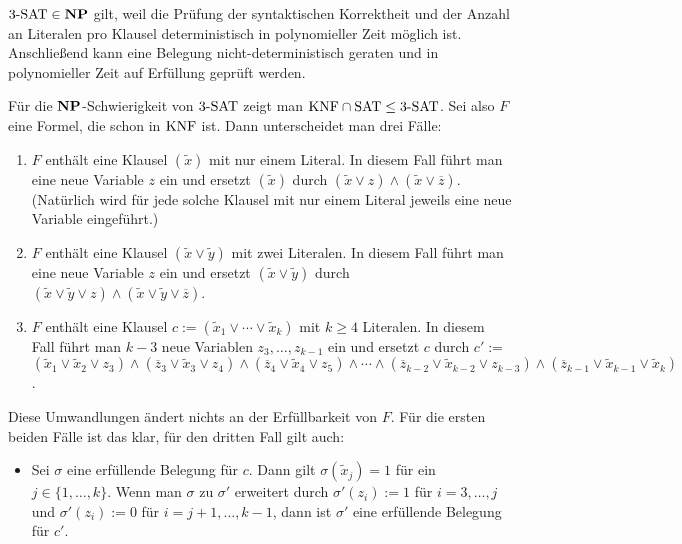 \begin{Beweis}
    $3\text{-SAT} \in \mathbf{NP}$ gilt, weil die Prüfung der syntaktischen Korrektheit und der Anzahl
    an Literalen pro Klausel deterministisch in polynomieller Zeit möglich ist.
    Anschließend kann eine Belegung nicht-deterministisch geraten und in polynomieller Zeit
    auf Erfüllung geprüft werden.
    
    Für die $\mathbf{NP}$-Schwierigkeit von $3\text{-SAT}$ zeigt man $\text{KNF} \cap \text{SAT} \le 3\text{-SAT}$.
    Sei also $F$ eine Formel, die schon in $\text{KNF}$ ist.
    Dann unterscheidet man drei Fälle:
    \begin{enumerate}
        \item
        $F$ enthält eine Klausel $(\widetilde{x})$ mit nur einem Literal.
        In diesem Fall führt man eine neue Variable $z$ ein und ersetzt $(\widetilde{x})$ durch
        $(\widetilde{x} \lor z) \land (\widetilde{x} \lor \overline{z})$.
        (Natürlich wird für jede solche Klausel mit nur einem Literal jeweils eine neue
        Variable eingeführt.)
        
        \item
        $F$ enthält eine Klausel $(\widetilde{x} \lor \widetilde{y})$ mit zwei Literalen.
        In diesem Fall führt man eine neue Variable $z$ ein und ersetzt
        $(\widetilde{x} \lor \widetilde{y})$ durch
        $(\widetilde{x} \lor \widetilde{y} \lor z) \land
        (\widetilde{x} \lor \widetilde{y} \lor \overline{z})$.
        
        \item
        $F$ enthält eine Klausel $c := (\widetilde{x}_1 \lor \dotsb \lor \widetilde{x}_k)$ mit
        $k \ge 4$ Literalen.
        In diesem Fall führt man $k - 3$ neue Variablen $z_3, \dotsc, z_{k-1}$ ein und ersetzt
        $c$ durch $c' :=$\\
        $(\widetilde{x}_1 \lor \widetilde{x}_2 \lor z_3) \land
        (\overline{z}_3 \lor \widetilde{x}_3 \lor z_4) \land
        (\overline{z}_4 \lor \widetilde{x}_4 \lor z_5) \land \dotsb \land
        (\overline{z}_{k-2} \lor \widetilde{x}_{k-2} \lor z_{k-3}) \land
        (\overline{z}_{k-1} \lor \widetilde{x}_{k-1} \lor \widetilde{x}_k)$.
    \end{enumerate}
    
    Diese Umwandlungen ändert nichts an der Erfüllbarkeit von $F$.
    Für die ersten beiden Fälle ist das klar, für den dritten Fall gilt auch:
    \begin{itemize}
        \item
        Sei $\sigma$ eine erfüllende Belegung für $c$.
        Dann gilt $\sigma(\widetilde{x}_j) = 1$ für ein $j \in \{1, \dotsc, k\}$.
        Wenn man $\sigma$ zu $\sigma'$ erweitert durch $\sigma'(z_i) := 1$ für $i = 3, \dotsc, j$
        und $\sigma'(z_i) := 0$ für $i = j + 1, \dotsc, k - 1$,
        dann ist $\sigma'$ eine erfüllende Belegung für $c'$.
        

\end{itemize}
\end{Beweis}
